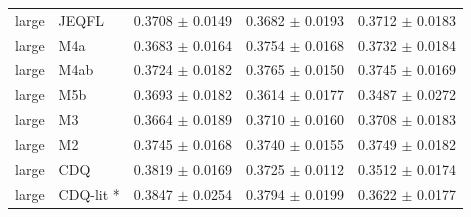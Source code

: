 \begin{table}[t]
\begin{tabular}{lllll}
large & JEQFL & 0.3708 $\pm$ 0.0149 & 0.3682 $\pm$ 0.0193 & 0.3712 $\pm$ 0.0183 \\
large & M4a & 0.3683 $\pm$ 0.0164 & 0.3754 $\pm$ 0.0168 & 0.3732 $\pm$ 0.0184 \\
large & M4ab & 0.3724 $\pm$ 0.0182 & 0.3765 $\pm$ 0.0150 & 0.3745 $\pm$ 0.0169 \\
large & M5b & 0.3693 $\pm$ 0.0182 & 0.3614 $\pm$ 0.0177 & 0.3487 $\pm$ 0.0272 \\
large & M3 & 0.3664 $\pm$ 0.0189 & 0.3710 $\pm$ 0.0160 & 0.3708 $\pm$ 0.0183 \\
large & M2 & 0.3745 $\pm$ 0.0168 & 0.3740 $\pm$ 0.0155 & 0.3749 $\pm$ 0.0182 \\
large & CDQ & 0.3819 $\pm$ 0.0169 & 0.3725 $\pm$ 0.0112 & 0.3512 $\pm$ 0.0174 \\
large & CDQ-lit * & 0.3847 $\pm$ 0.0254 & 0.3794 $\pm$ 0.0199 & 0.3622 $\pm$ 0.0177 \\
\bottomrule
\end{tabular}
\end{table}